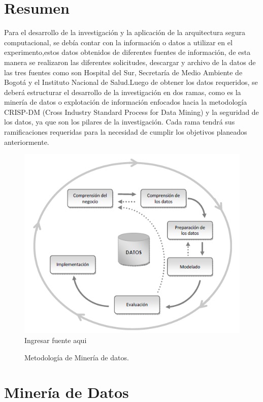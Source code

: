 \documentclass[a4paper,openright,12pt]{book}
\theoremstyle{definition}
\theoremstyle{remark}
\begin{document}
\section{Resumen}
Para el desarrollo de la investigación y la aplicación de la arquitectura segura computacional, se debía contar con la información o datos a utilizar en el experimento,estos datos obtenidos de diferentes fuentes de información, de esta manera se realizaron las diferentes solicitudes, descargar y archivo de la datos de las tres fuentes como son Hospital del Sur, Secretaría de Medio Ambiente de Bogotá y el Instituto Nacional de Salud.Luego de obtener los datos requeridos, se deberá estructurar el desarrollo de la investigación en dos ramas, como es la minería de datos o explotación de información enfocados hacia la metodología CRISP-DM (Cross Industry Standard Process for Data Mining)  y la seguridad de los datos, ya que son los pilares de la investigación. Cada rama tendrá sus ramificaciones requeridas para la necesidad de cumplir los objetivos planeados anteriormente.
\begin{figure}[htb]
\centering
\caption{Metodología de Minería de datos.} 
\includegraphics[scale=0.50]{CRIPS}
\\Ingresar fuente aqui
\label{fig:Ubicacion}
\end{figure}


\section{Minería de Datos}
\end{document}
